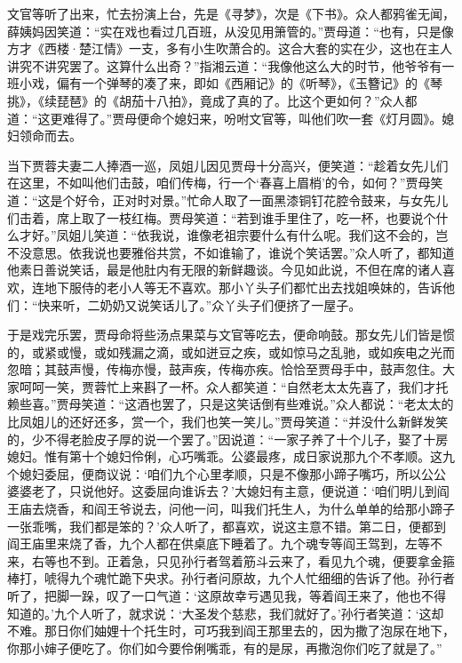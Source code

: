 \documentclass[12pt,oneside]{book}
\begin{document}
文官等听了出来，忙去扮演上台，先是《寻梦》，次是《下书》。众人都鸦雀无闻，薛姨妈因笑道：“实在戏也看过几百班，从没见用箫管的。”贾母道：“也有，只是像方才《西楼·楚江情》一支，多有小生吹萧合的。这合大套的实在少，这也在主人讲究不讲究罢了。这算什么出奇？”指湘云道：“我像他这么大的时节，他爷爷有一班小戏，偏有一个弹琴的凑了来，即如《西厢记》的《听琴》，《玉簪记》的《琴挑》，《续琵琶》的《胡茄十八拍》，竟成了真的了。比这个更如何？”众人都道：“这更难得了。”贾母便命个媳妇来，吩咐文官等，叫他们吹一套《灯月圆》。媳妇领命而去。

当下贾蓉夫妻二人捧酒一巡，凤姐儿因见贾母十分高兴，便笑道：“趁着女先儿们在这里，不如叫他们击鼓，咱们传梅，行一个‘春喜上眉梢’的令，如何？”贾母笑道：“这是个好令，正对时对景。”忙命人取了一面黑漆铜钉花腔令鼓来，与女先儿们击着，席上取了一枝红梅。贾母笑道：“若到谁手里住了，吃一杯，也要说个什么才好。”凤姐儿笑道：“依我说，谁像老祖宗要什么有什么呢。我们这不会的，岂不没意思。依我说也要雅俗共赏，不如谁输了，谁说个笑话罢。”众人听了，都知道他素日善说笑话，最是他肚内有无限的新鲜趣谈。今见如此说，不但在席的诸人喜欢，连地下服侍的老小人等无不喜欢。那小丫头子们都忙出去找姐唤妹的，告诉他们：“快来听，二奶奶又说笑话儿了。”众丫头子们便挤了一屋子。

于是戏完乐罢，贾母命将些汤点果菜与文官等吃去，便命响鼓。那女先儿们皆是惯的，或紧或慢，或如残漏之滴，或如迸豆之疾，或如惊马之乱驰，或如疾电之光而忽暗；其鼓声慢，传梅亦慢，鼓声疾，传梅亦疾。恰恰至贾母手中，鼓声忽住。大家呵呵一笑，贾蓉忙上来斟了一杯。众人都笑道：“自然老太太先喜了，我们才托赖些喜。”贾母笑道：“这酒也罢了，只是这笑话倒有些难说。”众人都说：“老太太的比凤姐儿的还好还多，赏一个，我们也笑一笑儿。”贾母笑道：“并没什么新鲜发笑的，少不得老脸皮子厚的说一个罢了。”因说道：“一家子养了十个儿子，娶了十房媳妇。惟有第十个媳妇伶俐，心巧嘴乖。公婆最疼，成日家说那九个不孝顺。这九个媳妇委屈，便商议说：‘咱们九个心里孝顺，只是不像那小蹄子嘴巧，所以公公婆婆老了，只说他好。这委屈向谁诉去？’大媳妇有主意，便说道：‘咱们明儿到阎王庙去烧香，和阎王爷说去，问他一问，叫我们托生人，为什么单单的给那小蹄子一张乖嘴，我们都是笨的？’众人听了，都喜欢，说这主意不错。第二日，便都到阎王庙里来烧了香，九个人都在供桌底下睡着了。九个魂专等阎王驾到，左等不来，右等也不到。正着急，只见孙行者驾着筋斗云来了，看见九个魂，便要拿金箍棒打，唬得九个魂忙跪下央求。孙行者问原故，九个人忙细细的告诉了他。孙行者听了，把脚一跺，叹了一口气道：‘这原故幸亏遇见我，等着阎王来了，他也不得知道的。’九个人听了，就求说：‘大圣发个慈悲，我们就好了。’孙行者笑道：‘这却不难。那日你们妯娌十个托生时，可巧我到阎王那里去的，因为撒了泡尿在地下，你那小婶子便吃了。你们如今要伶俐嘴乖，有的是尿，再撒泡你们吃了就是了。”
\end{document}
